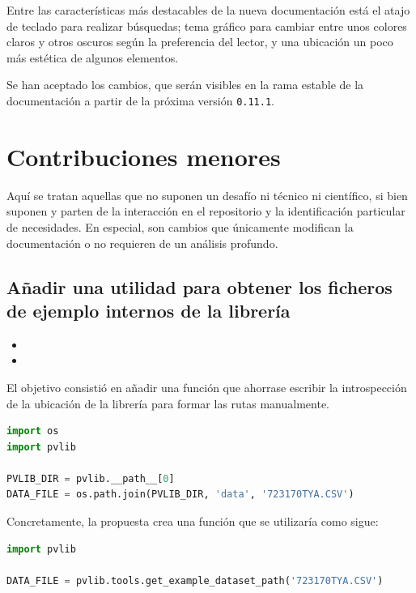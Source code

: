 Entre las características más destacables de la nueva documentación está el atajo de teclado para realizar búsquedas; tema gráfico para cambiar entre unos colores claros y otros oscuros según la preferencia del lector, y una ubicación un poco más estética de algunos elementos.

Se han aceptado los cambios, que serán visibles en la \gls{rama} estable de la documentación a partir de la próxima versión \texttt{0.11.1}.

\section{Contribuciones menores} \label{sct:desarrollo:contribuciones_menores}

Aquí se tratan aquellas que no suponen un desafío ni técnico ni científico, si bien suponen y parten de la interacción en el \gls{repositorio} y la identificación particular de necesidades. En especial, son cambios que únicamente modifican la documentación o no requieren de un análisis profundo.

\subsection{Añadir una utilidad para obtener los ficheros de ejemplo internos de la librería}

\begin{itemize}
    \item {}
    \item {}
\end{itemize}

El objetivo consistió en añadir una función que ahorrase escribir la introspección de la ubicación de la librería para formar las rutas manualmente.

\begin{lstlisting}[language=python, caption={Fragmento de código utilizado normalmente para obtener la ruta de los ficheros de la librería}, label={lst:example_files_current}]
import os
import pvlib

PVLIB_DIR = pvlib.__path__[0]
DATA_FILE = os.path.join(PVLIB_DIR, 'data', '723170TYA.CSV')
\end{lstlisting}

Concretamente, la propuesta crea una función que se utilizaría como sigue:

\begin{lstlisting}[language=python, caption={Fragmento de código utilizando la función propuesta para obtener la ruta de los ficheros de la librería}, label={lst:example_files_proposal}]
import pvlib

DATA_FILE = pvlib.tools.get_example_dataset_path('723170TYA.CSV')
\end{lstlisting}

